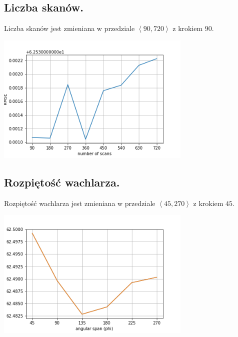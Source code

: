 \documentclass[a4paper, 11pt]{article}
\begin{document}
\subsection{Liczba skanów.}

Liczba skanów jest zmieniana w przedziale $\left<90, 720 \right>$ z krokiem $90$.

\begin{center}
	\includegraphics[width=0.7\textwidth]{scans.png}
\end{center}
\subsection{Rozpiętość wachlarza.}

Rozpiętość wachlarza jest zmieniana w przedziale $\left<45, 270 \right>$ z krokiem $45$.

\begin{center}
	\includegraphics[width=0.7\textwidth]{phi.png}
\end{center}
\end{document}

